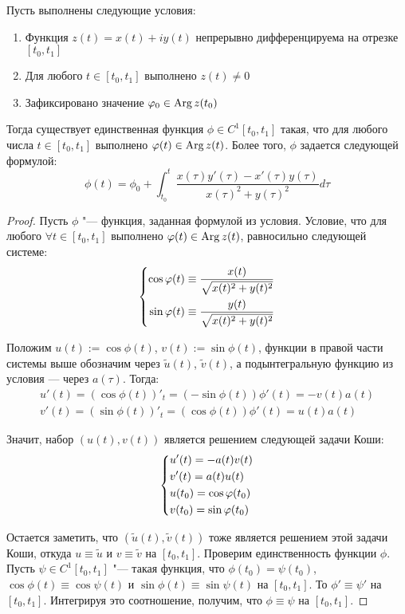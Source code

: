\begin{proposition}
	Пусть выполнены следующие условия:
	\begin{enumerate}
		\item Функция $z(t) = x(t) + iy(t)$ непрерывно дифференцируема на отрезке $[t_0, t_1]$
		\item Для любого $t \in [t_0, t_1]$ выполнено $z(t) \ne 0$
		\item Зафиксировано значение $\varphi_0 \in \operatorname{Arg}{z(t_0)}$
	\end{enumerate}

	Тогда существует единственная функция $\phi \in C^1[t_0, t_1]$ такая, что для любого числа $t \in [t_0, t_1]$ выполнено $\varphi(t) \in \operatorname{Arg} z(t)$. Более того, $\phi$ задается следующей формулой:
	\[\phi(t) = \phi_0 + \int_{t_0}^t\frac{x(\tau)y'(\tau) - x'(\tau)y(\tau)}{x(\tau)^2 + y(\tau)^2}d\tau\]
\end{proposition}

\begin{proof}
	Пусть $\phi$ "--- функция, заданная формулой из условия. Условие, что для любого $\forall t \in [t_0, t_1]$ выполнено $\varphi(t) \in \operatorname{Arg} z(t)$, равносильно следующей системе:
	\[\left\{\begin{aligned}
		\cos\varphi(t) \equiv \frac{x(t)}{\sqrt{x(t)^2 + y(t)^2}} \\
		\sin\varphi(t) \equiv \frac{y(t)}{\sqrt{x(t)^2 + y(t)^2}}
	\end{aligned}\right.\]
	
	Положим $u(t) := \cos\phi(t)$, $v(t) := \sin\phi(t)$, функции в правой части системы выше обозначим через $\widetilde u(t)$, $\widetilde v(t)$, а подынтегральную функцию из условия --- через $a(\tau)$. Тогда:
	\begin{gather*}
		u'(t) = (\cos\phi(t))'_t = (-\sin\phi(t))\phi'(t) = -v(t)a(t)\\
		v'(t) = (\sin\phi(t))'_t = (\cos\phi(t))\phi'(t) = u(t)a(t)
	\end{gather*}
	
	Значит, набор $(u(t), v(t))$ является решением следующей задачи Коши:
	\[\left\{\begin{aligned}
	&u'(t) = -a(t)v(t)\\
	&v'(t) = a(t)u(t)\\
	&u(t_0) = \cos\varphi(t_0)\\
	&v(t_0) = \sin\varphi(t_0)\end{aligned}\right.\]
	
	Остается заметить, что $(\widetilde u(t), \widetilde v(t))$ тоже является решением этой задачи Коши, откуда $u \equiv \widetilde u$ и $v \equiv \widetilde v$ на $[t_0, t_1]$. Проверим единственность функции $\phi$. Пусть $\psi \in C^1[t_0, t_1]$ "--- такая функция, что $\phi(t_0) = \psi(t_0)$, $\cos\phi(t) \equiv \cos\psi(t)$ и $\sin\phi(t) \equiv \sin\psi(t)$ на $[t_0, t_1]$. То $\phi' \equiv \psi'$ на $[t_0, t_1]$. Интегрируя это соотношение, получим, что $\phi \equiv \psi$ на $[t_0, t_1]$.
\end{proof}

